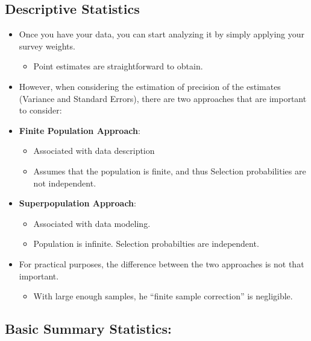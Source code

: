 \documentclass[
  letterpaper,
  DIV=11,
  numbers=noendperiod]{scrartcl}
\providecommand{\tightlist}{%
  \setlength{\itemsep}{0pt}\setlength{\parskip}{0pt}}\usepackage{longtable,booktabs,array}
\begin{document}
\subsection{Descriptive Statistics}\label{descriptive-statistics}

\begin{itemize}
\item
  Once you have your data, you can start analyzing it by simply applying
  your survey weights.

  \begin{itemize}
  \tightlist
  \item
    Point estimates are straightforward to obtain.
  \end{itemize}
\item
  However, when considering the estimation of precision of the estimates
  (Variance and Standard Errors), there are two approaches that are
  important to consider:
\item
  \textbf{Finite Population Approach}:

  \begin{itemize}
  \tightlist
  \item
    Associated with data description
  \item
    Assumes that the population is finite, and thus Selection
    probabilities are not independent.
  \end{itemize}
\item
  \textbf{Superpopulation Approach}:

  \begin{itemize}
  \tightlist
  \item
    Associated with data modeling.
  \item
    Population is infinite. Selection probabilties are independent.
  \end{itemize}
\item
  For practical purposes, the difference between the two approaches is
  not that important.

  \begin{itemize}
  \tightlist
  \item
    With large enough samples, he ``finite sample correction'' is
    negligible.
  \end{itemize}
\end{itemize}

\subsection{Basic Summary Statistics:}\label{basic-summary-statistics}
\end{document}

